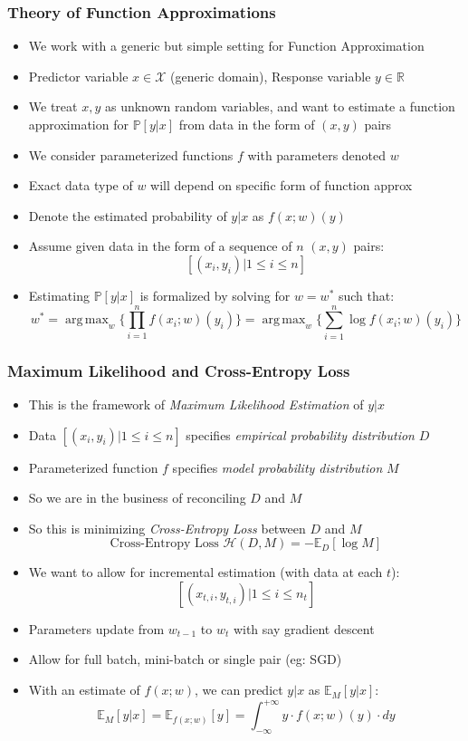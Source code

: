 \documentclass{beamer}
\DeclareMathOperator*{\argmax}{arg\,max}
\begin{document}
\begin{frame}
\frametitle{Theory of Function Approximations}
\pause
\begin{itemize}[<+->]
\item We work with a generic but simple setting for Function Approximation
\item Predictor variable $x \in \mathcal{X}$ (generic domain), Response variable $y \in \mathbb{R}$
\item We treat $x, y$ as unknown random variables, and want to estimate a function approximation for $\mathbb{P}[y|x]$ from data in the form of $(x,y)$ pairs
\item We consider parameterized functions $f$ with parameters denoted $w$
\item  Exact data type of $w$ will depend on specific form of function approx
\item  Denote the estimated probability of $y|x$ as $f(x; w)(y)$
\item  Assume given data in the form of a sequence of $n$ $(x,y)$ pairs:
$$[(x_i, y_i)|1 \leq i \leq n]$$
\item  Estimating $\mathbb{P}[y|x]$ is formalized by solving for $w=w^*$ such that:
$$w^* = \argmax_w \{ \prod_{i=1}^n f(x_i; w)(y_i)\} = \argmax_w \{ \sum_{i=1}^n \log f(x_i; w)(y_i)\}$$
\end{itemize}
\end{frame}

\begin{frame}
\frametitle{Maximum Likelihood and Cross-Entropy Loss}
\pause
\begin{itemize}[<+->]
\item This is the framework of {\em Maximum Likelihood Estimation} of $y|x$
\item Data $[(x_i, y_i)|1 \leq i \leq n]$ specifies {\em empirical probability distribution} $D$
\item Parameterized function $f$ specifies {\em model probability distribution} $M$
\item So we are in the business of reconciling $D$ and $M$
\item So this is minimizing {\em Cross-Entropy Loss} between $D$ and $M$
$$ \text{Cross-Entropy Loss } \mathcal{H}(D, M) = -\mathbb{E}_D[\log M]$$
\item We want to allow for incremental estimation (with data at each $t$):
$$[(x_{t,i}, y_{t,i})|1 \leq i \leq n_t]$$
\item Parameters update from $w_{t-1}$ to $w_t$ with say gradient descent
\item Allow for full batch, mini-batch or single pair (eg: SGD)
\item With an estimate of $f(x;w)$, we can predict $y|x$ as $\mathbb{E}_M[y|x]$:
$$\mathbb{E}_M[y|x] = \mathbb{E}_{f(x;w)}[y] = \int_{-\infty}^{+\infty} y \cdot f(x;w)(y) \cdot dy$$
\end{itemize}
\end{frame}
\end{document}
